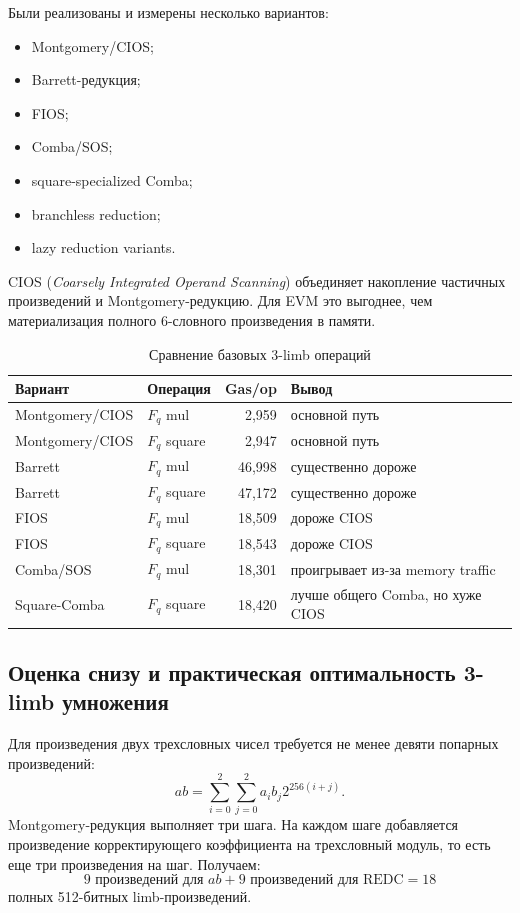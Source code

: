 \documentclass[12pt,a4paper]{article}
\begin{document}
Были реализованы и измерены несколько вариантов:
\begin{itemize}
    \item Montgomery/CIOS;
    \item Barrett-редукция;
    \item FIOS;
    \item Comba/SOS;
    \item square-specialized Comba;
    \item branchless reduction;
    \item lazy reduction variants.
\end{itemize}

CIOS (\emph{Coarsely Integrated Operand Scanning}) объединяет накопление
частичных произведений и Montgomery-редукцию. Для EVM это выгоднее, чем
материализация полного 6-словного произведения в памяти.

\begin{table}[htbp]
\centering
\caption{Сравнение базовых 3-limb операций}
\small
\begin{tabularx}{\linewidth}{Y l r Y}
\toprule
Вариант & Операция & Gas/op & Вывод \\
\midrule
Montgomery/CIOS & $F_q$ mul & 2,959 & основной путь \\
Montgomery/CIOS & $F_q$ square & 2,947 & основной путь \\
Barrett & $F_q$ mul & 46,998 & существенно дороже \\
Barrett & $F_q$ square & 47,172 & существенно дороже \\
FIOS & $F_q$ mul & 18,509 & дороже CIOS \\
FIOS & $F_q$ square & 18,543 & дороже CIOS \\
Comba/SOS & $F_q$ mul & 18,301 & проигрывает из-за memory traffic \\
Square-Comba & $F_q$ square & 18,420 & лучше общего Comba, но хуже CIOS \\
\bottomrule
\end{tabularx}
\end{table}

\subsection{Оценка снизу и практическая оптимальность 3-limb умножения}

Для произведения двух трехсловных чисел требуется не менее девяти попарных
произведений:
\[
    ab=\sum_{i=0}^{2}\sum_{j=0}^{2}a_i b_j 2^{256(i+j)}.
\]
Montgomery-редукция выполняет три шага. На каждом шаге добавляется произведение
корректирующего коэффициента на трехсловный модуль, то есть еще три произведения
на шаг. Получаем:
\[
    9\text{ произведений для }ab+
    9\text{ произведений для REDC}=18
\]
полных 512-битных limb-произведений.
\end{document}
